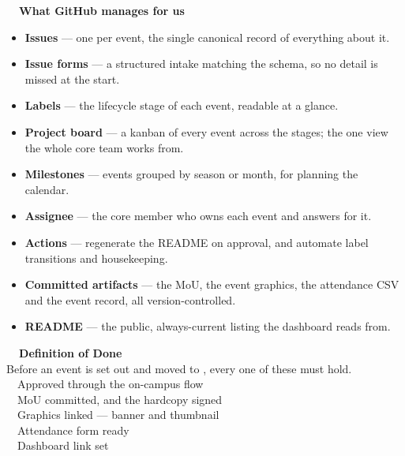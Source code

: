 \documentclass[11pt,a4paper]{article}
\newcommand{\pill}[2]{\tikz[baseline]{\node[fill=#1,text=white,font=\bfseries\small,%
  rounded corners=3pt,inner xsep=7pt,inner ysep=2.5pt]{#2};}}
\begin{document}
\vspace{18pt}
{\bfseries\color{Ink}~~What GitHub manages for us}
\begin{itemize}[leftmargin=1.5em,itemsep=7pt,topsep=6pt]
  \item \textbf{Issues} — one per event, the single canonical record of everything about it.
  \item \textbf{Issue forms} — a structured intake matching the schema, so no detail is missed at the
        start.
  \item \textbf{Labels} — the lifecycle stage of each event, readable at a glance.
  \item \textbf{Project board} — a kanban of every event across the stages; the one view the whole
        core team works from.
  \item \textbf{Milestones} — events grouped by season or month, for planning the calendar.
  \item \textbf{Assignee} — the core member who owns each event and answers for it.
  \item \textbf{Actions} — regenerate the README on approval, and automate label transitions and
        housekeeping.
  \item \textbf{Committed artifacts} — the MoU, the event graphics, the attendance CSV and the event
        record, all version-controlled.
  \item \textbf{README} — the public, always-current listing the dashboard reads from.
\end{itemize}
\clearpage

\begin{tcolorbox}[enhanced,colback=white,colframe=GGrn,boxrule=1.2pt,arc=6pt,
    left=18pt,right=18pt,top=15pt,bottom=15pt,drop shadow={black!10}]
  {\bfseries\Large\color{GGrn}~~Definition of Done}\\[3pt]
  {\small\color{Slate}Before an event is set out and moved to \pill{GBlue}{listed}, every one of these
  must hold.}\\[11pt]
  {\color{Ink}\large
  ~~Approved through the on-campus flow\\[7pt]
  ~~MoU committed, and the hardcopy signed\\[7pt]
  ~~Graphics linked — banner and thumbnail\\[7pt]
  ~~Attendance form ready\\[7pt]
  ~~Dashboard link set}
\end{tcolorbox}
\end{document}
